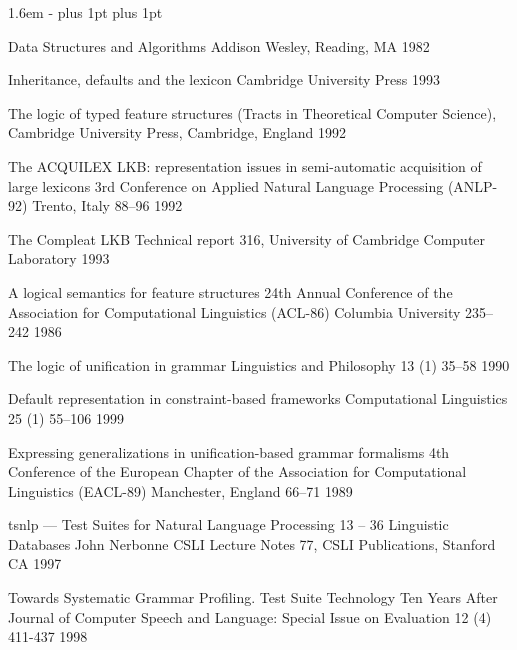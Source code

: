 \documentclass[12pt]{report}
\begin{document}
\begin{list}{}
   {\leftmargin 1.6em
    \itemindent -\leftmargin
    \itemsep 0pt plus 1pt
    \parsep 0pt plus 1pt}

{Data Structures and Algorithms}
{Addison Wesley, Reading, MA}
{1982}

{Inheritance, defaults and the lexicon}
{Cambridge University Press}
{1993}

{The logic of typed feature structures}
{(Tracts in Theoretical Computer Science), Cambridge University Press,
  Cambridge, England} 
{1992}


{The ACQUILEX LKB: representation issues in semi-automatic
acquisition of large lexicons}
{3rd Conference on Applied Natural Language Processing (ANLP-92)}
{Trento, Italy}
{88--96}
{1992}

{The Compleat LKB}
{Technical report 316,
University of Cambridge Computer Laboratory}
{1993}


{A logical semantics for feature structures}
{24th Annual Conference of the Association for Computational
Linguistics (ACL-86)}
{Columbia University}
{235--242}
{1986}

{The logic of unification in grammar}
{Linguistics and Philosophy}
{13 (1)}
{35--58}
{1990}

{Default representation in constraint-based frameworks}
{Computational Linguistics}
{25 (1)}
{55--106}
{1999}

  {Expressing generalizations in unification-based grammar formalisms}
  {4th Conference of the European Chapter of the Association 
for Computational Linguistics (EACL-89)}
  {Manchester, England}
  {66--71}
  {1989}

{{\sc tsnlp} --- {T}est {S}uites for {N}atural {L}anguage {P}rocessing}
{13 -- 36}
{Linguistic Databases}
{John Nerbonne}
{CSLI Lecture Notes 77, CSLI Publications, Stanford CA}
{1997}

{Towards Systematic Grammar Profiling.
               {T}est Suite Technology Ten Years After}
{Journal of Computer Speech and Language:
Special Issue on Evaluation}
{12 (4)}
{411-437}
{1998}


\end{list}
\end{document}
